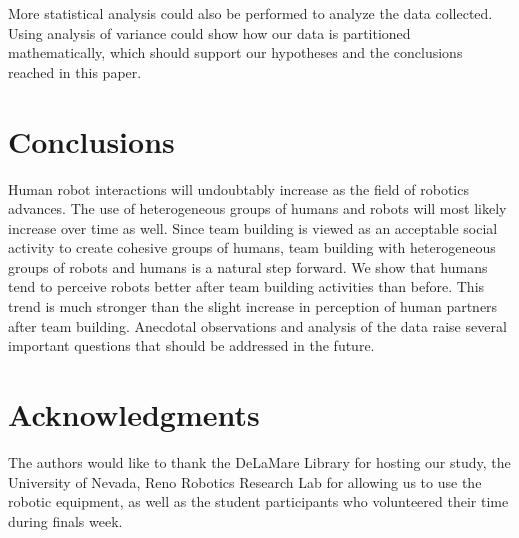 \documentclass{acm_proc_article-sp}
\begin{document}
More statistical analysis could also be performed to analyze the data collected. Using analysis of variance could show how our data is partitioned mathematically, which should support our hypotheses and the conclusions reached in this paper.

\section{Conclusions}
\label{section:conclusions}
Human robot interactions will undoubtably increase as the field of robotics advances. The use of heterogeneous groups of humans and robots will most likely increase over time as well. Since team building is viewed as an acceptable social activity to create cohesive groups of humans, team building with heterogeneous groups of robots and humans is a natural step forward. We show that humans tend to perceive robots better after team building activities than before. This trend is much stronger than the slight increase in perception of human partners after team building. Anecdotal observations and analysis of the data raise several important questions that should be addressed in the future. 


\section{Acknowledgments}
\label{section:}
The authors would like to thank the DeLaMare Library for hosting our study, the University of Nevada, Reno Robotics Research Lab for allowing us to use the robotic equipment, as well as the student participants who volunteered their time during finals week.

%

\end{document}
